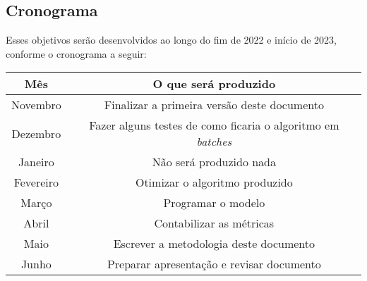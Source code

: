 \subsection{Cronograma} \label{Cronograma}

Esses objetivos serão desenvolvidos ao longo do fim de 2022 e início de 2023, conforme o 
cronograma a seguir:

\begin{center}
    \begin{tabular}{|c|c|}
        \hline
        Mês & O que será produzido \\
        \hline
        Novembro & Finalizar a primeira versão deste documento \\
        \hline
        Dezembro & Fazer alguns testes de como ficaria o algoritmo em \emph{batches} \\
        \hline
        Janeiro & Não será produzido nada \\
        \hline 
        Fevereiro & Otimizar o algoritmo produzido \\
        \hline
        Março & Programar o modelo \\
        \hline
        Abril & Contabilizar as métricas \\
        \hline
        Maio & Escrever a metodologia deste documento \\
        \hline
        Junho & Preparar apresentação e revisar documento \\
        \hline
    \end{tabular}
\end{center}